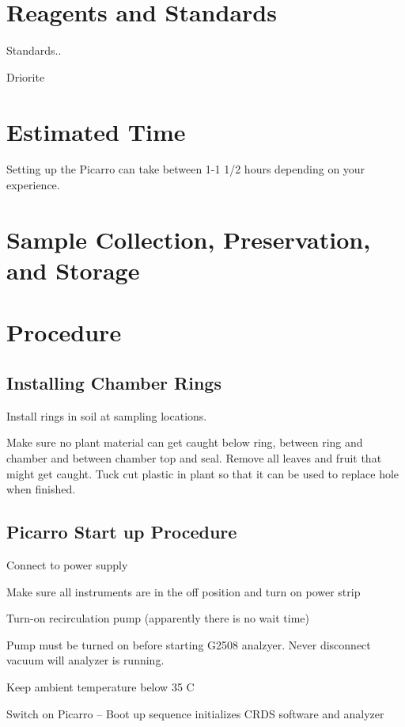 \documentclass[12pt]{../SOP3_alpha}
\begin{document}
\section{Reagents and Standards}

\NP Standards..

\NP Driorite


\section{Estimated Time}

\NP Setting up the Picarro can take between 1-1 1/2 hours depending on your experience.

\section{Sample Collection, Preservation, and Storage}

\section{Procedure}

\subsection{Installing Chamber Rings}

\NP Install rings in soil at sampling locations. 

\NP Make sure no plant material can get caught below ring, between ring and chamber and between chamber top and seal. Remove all leaves and fruit that might get caught. Tuck cut plastic in plant so that it can be used to replace hole when finished.

\subsection{Picarro Start up Procedure}

\NP Connect to power supply

\NP Make sure all instruments are in the off position and turn on power strip

\NP Turn-on recirculation pump (apparently there is no wait time)

\NP Pump must be turned on before starting G2508 analzyer. Never disconnect vacuum will analyzer is running.

\NP Keep ambient temperature below 35 C

\NP Switch on Picarro  -- Boot up sequence initializes CRDS software and analyzer
\end{document}
